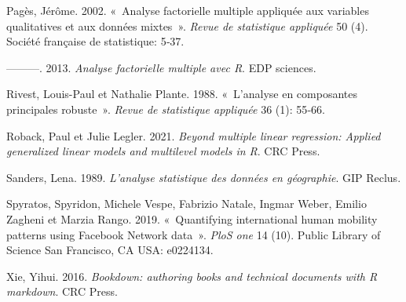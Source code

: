 \documentclass[
  11pt,
  french,
]{book}
\begin{document}
\leavevmode\hypertarget{ref-pages2002analyse}{}%
Pagès, Jérôme. 2002. «~Analyse factorielle multiple appliquée aux variables qualitatives et aux données mixtes~». \emph{Revue de statistique appliquée} 50 (4). Société française de statistique: 5‑37.

\leavevmode\hypertarget{ref-pages2013analyse}{}%
---------. 2013. \emph{Analyse factorielle multiple avec R}. EDP sciences.

\leavevmode\hypertarget{ref-rivest1988analyse}{}%
Rivest, Louis-Paul et Nathalie Plante. 1988. «~L'analyse en composantes principales robuste~». \emph{Revue de statistique appliquée} 36 (1): 55‑66.

\leavevmode\hypertarget{ref-roback2021beyond}{}%
Roback, Paul et Julie Legler. 2021. \emph{Beyond multiple linear regression: Applied generalized linear models and multilevel models in R}. CRC Press.

\leavevmode\hypertarget{ref-sanders1989analyse}{}%
Sanders, Lena. 1989. \emph{L'analyse statistique des données en géographie}. GIP Reclus.

\leavevmode\hypertarget{ref-spyratos2019quantifying}{}%
Spyratos, Spyridon, Michele Vespe, Fabrizio Natale, Ingmar Weber, Emilio Zagheni et Marzia Rango. 2019. «~Quantifying international human mobility patterns using Facebook Network data~». \emph{PloS one} 14 (10). Public Library of Science San Francisco, CA USA: e0224134.

\leavevmode\hypertarget{ref-xie2016bookdown}{}%
Xie, Yihui. 2016. \emph{Bookdown: authoring books and technical documents with R markdown}. CRC Press.

\printindex
\end{document}
